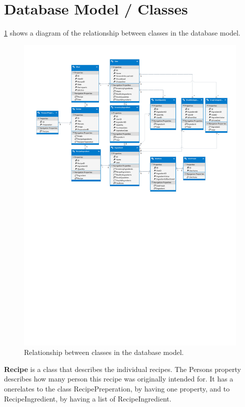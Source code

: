 \section{Database Model / Classes}
\cref{DatabaseModel} shows a diagram of the relationship between classes in the database model.

\begin{figure}[H]
	\centering
    \includegraphics[width=1\textwidth, trim=0 400 0 0]{Grafik/FoodDatabase.pdf}
	\caption{Relationship between classes in the database model.}
	\label{DatabaseModel}
\end{figure}

\textbf{Recipe} is a class that describes the individual recipes. The Persons property describes how many person this recipe was originally intended for. It has a onerelates to the class RecipePreperation, by having one property, and to RecipeIngredient, by having a list of RecipeIngredient. 

